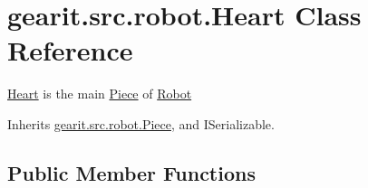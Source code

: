 \hypertarget{classgearit_1_1src_1_1robot_1_1_heart}{\section{gearit.\+src.\+robot.\+Heart Class Reference}
\label{classgearit_1_1src_1_1robot_1_1_heart}
}


\hyperlink{classgearit_1_1src_1_1robot_1_1_heart}{Heart} is the main \hyperlink{classgearit_1_1src_1_1robot_1_1_piece}{Piece} of \hyperlink{classgearit_1_1src_1_1robot_1_1_robot}{Robot}  




Inherits \hyperlink{classgearit_1_1src_1_1robot_1_1_piece}{gearit.\+src.\+robot.\+Piece}, and I\+Serializable.

\subsection*{Public Member Functions}
